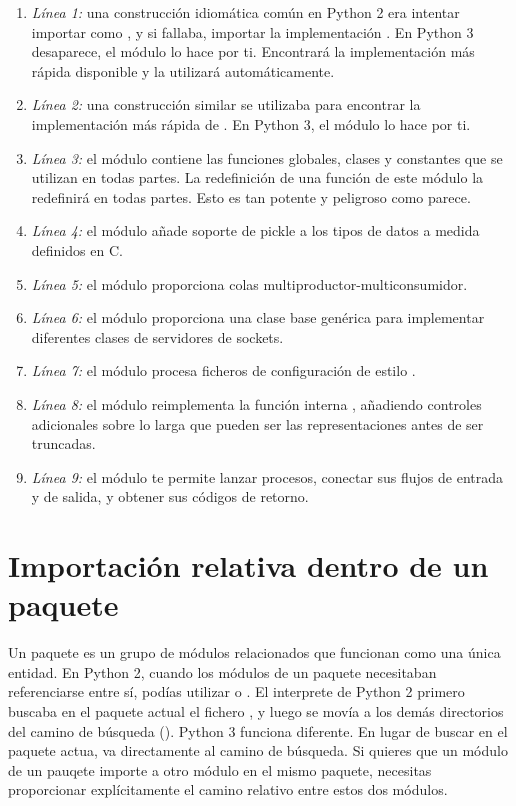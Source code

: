 \begin{enumerate}
  \item \emph{Línea 1:} una construcción idiomática común en Python 2 era intentar importar  como , y si fallaba, importar la implementación . En Python 3 desaparece, el módulo  lo hace por ti. Encontrará la implementación más rápida disponible y la utilizará automáticamente.
  \item \emph{Línea 2:} una construcción similar se utilizaba para encontrar la implementación más rápida de . En Python 3, el módulo  lo hace por ti.
  \item \emph{Línea 3:} el módulo  contiene las funciones globales, clases y constantes que se utilizan en todas partes. La redefinición de una función de este módulo la redefinirá en todas partes. Esto es tan potente y peligroso como parece.
  \item \emph{Línea 4:} el módulo  añade soporte de pickle a los tipos de datos a medida definidos en C.
  \item \emph{Línea 5:} el módulo  proporciona colas multiproductor-multiconsumidor.
  \item \emph{Línea 6:} el módulo  proporciona una clase base genérica para implementar diferentes clases de servidores de sockets.
  \item \emph{Línea 7:} el módulo  procesa ficheros de configuración de estilo .
  \item \emph{Línea 8:} el módulo  reimplementa la función interna , añadiendo controles adicionales sobre lo larga que pueden ser las representaciones antes de ser truncadas.
  \item \emph{Línea 9:} el módulo  te permite lanzar procesos, conectar sus flujos de entrada y de salida, y obtener sus códigos de retorno.
\end{enumerate}

\section{Importación relativa dentro de un paquete}

Un paquete es un grupo de módulos relacionados que funcionan como una única entidad. En Python 2, cuando los módulos de un paquete necesitaban referenciarse entre sí, podías utilizar  o . El interprete de Python 2 primero buscaba en el paquete actual el fichero , y luego se movía a los demás directorios del camino de búsqueda (). Python 3 funciona diferente. En lugar de buscar en el paquete actua, va directamente al camino de búsqueda. Si quieres que un módulo de un pauqete importe a otro módulo en el mismo paquete, necesitas proporcionar explícitamente el camino relativo entre estos dos módulos.

